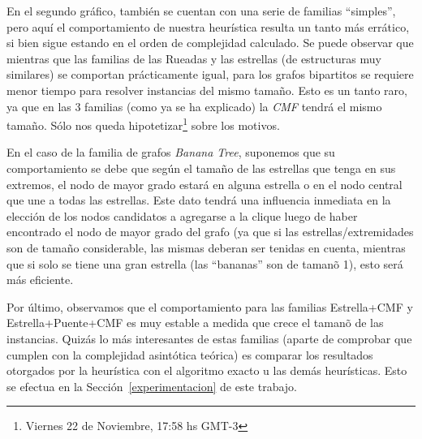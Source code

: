 \par En el segundo gr\'afico, tambi\'en se cuentan con una serie de familias
    ``simples'', pero aqu\'i el comportamiento de nuestra heur\'istica resulta
    un tanto m\'as err\'atico, si bien sigue estando en el orden de complejidad
    calculado. Se puede observar que mientras que las familias de las 
    Rueadas y las estrellas (de estructuras muy similares) se comportan pr\'acticamente
    igual, para los grafos bipartitos se requiere menor tiempo para resolver
    instancias del mismo tama\~no. Esto es un tanto raro, ya que en las 3 familias
    (como ya se ha explicado) la \emph{CMF} tendr\'a el mismo tama\~no. S\'olo
    nos queda hipotetizar\footnote{Viernes 22 de Noviembre, 17:58 hs GMT-3} sobre los motivos.

\par En el caso de la familia de grafos \emph{Banana Tree}, suponemos que su comportamiento
    se debe que seg\'un el tama\~no de las estrellas que tenga en sus extremos, el nodo
    de mayor grado estar\'a en alguna estrella o en el nodo central que une a todas las estrellas.
    Este dato tendr\'a una influencia inmediata en la elecci\'on de los nodos candidatos
    a agregarse a la clique luego de haber encontrado el nodo de mayor grado del grafo (ya
    que si las estrellas/extremidades son de tama\~no considerable, las mismas
    deberan ser tenidas en cuenta, mientras que si solo se tiene una gran estrella (las
    ``bananas'' son de taman\~o 1), esto ser\'a m\'as eficiente.

\par Por \'ultimo, observamos que el comportamiento para las familias Estrella+CMF y
    Estrella+Puente+CMF es muy estable a medida que crece el taman\~o de las instancias.
    Quiz\'as lo m\'as interesantes de estas familias (aparte de comprobar que cumplen
    con la complejidad asint\'otica te\'orica) es comparar los resultados otorgados
    por la heur\'istica con el algoritmo exacto u las dem\'as heur\'isticas. Esto
    se efectua en la Secci\'on~\ref{experimentacion} de este trabajo.
